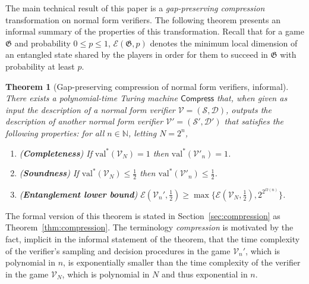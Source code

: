 \documentclass[11pt]{article}
\newtheorem{theorem}{Theorem}[section]
\theoremstyle{definition}
\newcommand{\N}{\ensuremath{\mathbb{N}}}
\newcommand{\val}{\ensuremath{\mathrm{val}}}
\newcommand{\game}{\mathfrak{G}}
\newcommand{\sampler}{\mathcal{S}}
\newcommand{\decider}{\mathcal{D}}
\newcommand{\verifier}{\mathcal{V}}
\newcommand{\Ent}{\mathscr{E}}
\newcommand{\tmstyle}[1]{\ensuremath{\mathsf{#1}}}
\newcommand{\Compress}{\tmstyle{Compress}}
\begin{document}
The main technical result of this paper is a \emph{gap-preserving compression} transformation on normal form verifiers. The following theorem presents an informal summary of the properties of this transformation. Recall that for a  game $\game$ and probability $0\leq p \leq 1$, $\Ent(\game,p)$ denotes the minimum local dimension of an entangled state shared by the players in order for them to succeed in $\game$ with probability at least $p$.

\begin{theorem}[Gap-preserving compression of normal form verifiers, informal]
\label{thm:compression-informal}
There exists a polynomial-time Turing machine $\Compress$ that, when given as input the description of a normal form verifier $\verifier = (\sampler,\decider)$, outputs the description of another normal form verifier $\verifier' = (\sampler',\decider')$ that satisfies the following properties: for all $n \in \N$, letting $N = 2^n$,
\begin{enumerate}
\item (\textbf{Completeness}) If $\val^*(\verifier_N) = 1$ then $\val^*(\verifier'_n) = 1$.
\item (\textbf{Soundness}) If $\val^*(\verifier_N) \leq \frac{1}{2}$ then $\val^*(\verifier'_n) \leq \frac{1}{2}$.
\item (\textbf{Entanglement lower bound}) $\Ent(\verifier_n',\frac{1}{2}) \geq \max \{ \Ent(\verifier_N,\frac{1}{2}), 2^{2^{\Omega(n)}} \}$. 
\end{enumerate}
\end{theorem}
\noindent The formal version of this theorem is stated in Section~\ref{sec:compression} as Theorem~\ref{thm:compression}. The terminology \emph{compression} is motivated by the fact, implicit in the informal statement of the theorem, that the time complexity of the verifier's sampling and decision procedures in the game $\verifier_n'$, which is polynomial in $n$, is exponentially smaller than the time complexity of the verifier in the game $\verifier_N$, which is polynomial in $N$ and thus exponential in $n$. 
\end{document}
